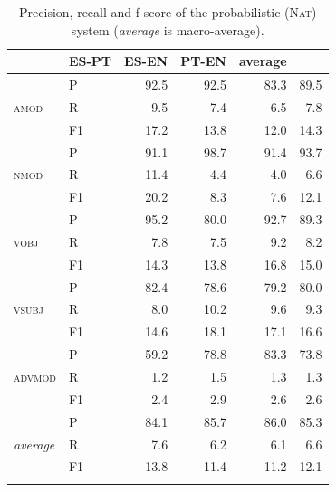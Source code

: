 \documentclass[output=paper,modfonts,nonflat]{langsci/langscibook}
\begin{document}
\begin{table}
  \begin{center}
    \caption{\label{tab:nat} Precision, recall and f-score of the probabilistic (\textsc{Nat}) system (\emph{average} is macro-average).}
    \begin{tabular}{llrrrr}
      \lsptoprule
      \multicolumn{2}{l}{\textbf{Pattern}} & \textbf{ES-PT} & \textbf{ES-EN} & \textbf{PT-EN} & \textbf{average}\\
      \midrule
	\multirow{3}{*}{\textsc{amod}} & P & 92.5 & 92.5 & 83.3 & 89.5\\
	& R & 9.5 & 7.4 & 6.5 & 7.8\\
	& F1 & 17.2 & 13.8 & 12.0 & 14.3\\ \midrule
	\multirow{3}{*}{\textsc{nmod}} & P & 91.1 & 98.7 & 91.4 & 93.7\\
	& R & 11.4 & 4.4 & 4.0 & 6.6\\
	& F1 & 20.2 & 8.3 & 7.6 & 12.1\\ \midrule
	\multirow{3}{*}{\textsc{vobj}} & P & 95.2 & 80.0 & 92.7 & 89.3\\
	& R & 7.8 & 7.5 & 9.2 & 8.2\\
	& F1 & 14.3 & 13.8 & 16.8 & 15.0\\ \midrule
	\multirow{3}{*}{\textsc{vsubj}} & P & 82.4 & 78.6 & 79.2 & 80.0\\
	& R & 8.0 & 10.2 & 9.6 & 9.3\\
	& F1 & 14.6 & 18.1 & 17.1 & 16.6\\ \midrule
	\multirow{3}{*}{\textsc{advmod}} & P & 59.2 & 78.8 & 83.3 & 73.8\\
	& R & 1.2 & 1.5 & 1.3 & 1.3\\
	& F1 & 2.4 & 2.9 & 2.6 & 2.6\\ \midrule
	\multirow{3}{*}{\emph{average}} & P & 84.1 & 85.7 & 86.0 & 85.3\\
	& R & 7.6 & 6.2 & 6.1 & 6.6\\
	& F1 & 13.8 & 11.4 & 11.2 & 12.1\\
      \lspbottomrule
    \end{tabular}
  \end{center}
\end{table}
\end{document}
